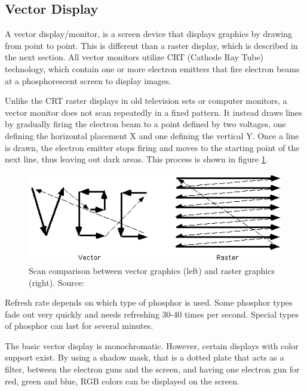 \subsection{Vector Display}
A vector display/monitor, is a screen device that displays graphics by drawing from point to point. This is different than a raster display, which is described in the next section.
All vector monitors utilize CRT (Cathode Ray Tube) technology, which contain one or more electron emitters that fire electron beams at a phosphorescent screen to display images.

Unlike the CRT raster displays in old television sets or computer monitors, a vector monitor does not scan repeatedly in a fixed pattern. It instead draws lines by gradually firing the electron beam to a point defined by two voltages, one defining the horizontal placement X and one defining the vertical Y. Once a line is drawn, the electron emitter stops firing and moves to the starting point of the next line, thus leaving out dark areas. This process is shown in figure \ref{fig:vectorscan}.

\begin{figure}[h!]
\centering \includegraphics[width=0.8\linewidth]{images/scan.gif}
\caption{Scan comparison between vector graphics (left) and raster graphics (right). Source: \cite{vecvsras}}
\label{fig:vectorscan}
\end{figure}

Refresh rate depends on which type of phosphor is used. Some phosphor types fade out very quickly and needs refreshing 30-40 times per second. Special types of phosphor can last for several minutes.

The basic vector display is monochromatic. However, certain displays with color support exist. By using a shadow mask, that is a dotted plate that acts as a filter, between the electron guns and the screen, and having one electron gun for red, green and blue, RGB colors can be displayed on the screen.

